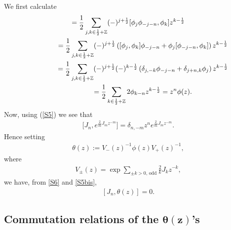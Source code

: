 \documentclass[11pt]{article}
\numberwithin{equation}{section}
\newcommand{\INZ}[2]{\in\frac#1#2 +\mathbb{Z}}
\begin{document}
We f\/irst calculate
\begin{gather}
  [J_n, \phi(z)] =\frac 12\sum_{j,k\INZ12}(-)^{j+\frac 12}
[\phi_j\phi_{-j-n}, \phi_k]z^{k-\frac 12}\nonumber\\
\hphantom{[J_n, \phi(z)]}{} =\frac{1}{2}\sum_{j,k\INZ12}(-)^{j+\frac 12} \left(
[\phi_j, \phi_k]\phi_{-j-n}+ \phi_j[\phi_{-j-n}, \phi_k]
\right) z^{k-\frac12}\nonumber\\
\hphantom{[J_n, \phi(z)]}{}
=\frac 12\sum_{j,k\INZ12}(-)^{j+\frac 12}
(-)^{k-\frac 12}\left(\delta_{j,-k}\phi_{-j-n}+\delta_{j+n,k}\phi_j\right)
z^{k-\frac 12}\nonumber\\
\hphantom{[J_n, \phi(z)]}{}
=\frac12\sum_{k\INZ12} 2\phi_{k-n}z^{k-\frac 12}
=z^n\phi(z) .\label{S6}
\end{gather}
Now, using (\ref{S5}) we see that
\begin{gather}\label{S5bis}
\big[J_n,e^{\frac2m J_mz^{-m}}\big]=\delta_{n,-m}z^n e^{\frac2m J_mz^{-m}}.
\end{gather}
Hence setting
\begin{gather}\label{theta}
 \theta(z):=V_-(z)^{-1}\phi(z)V_+(z)^{-1},
\end{gather}
where
\begin{gather}
\label{exp}
V_\pm(z)
=\exp\sum_{\pm k>0,\,\mathrm{odd}}\frac{2}{k}J_k z^{-k} ,
\end{gather}
we have, from
\eqref{S6} and \eqref{S5bis},
\begin{gather}\label{comm-Htheta}
[J_n, \theta(z)]=0 .
\end{gather}

\subsection[Commutation relations of the $\theta(z)$'s]{Commutation relations of the $\boldsymbol{\theta(z)}$'s}
\end{document}
